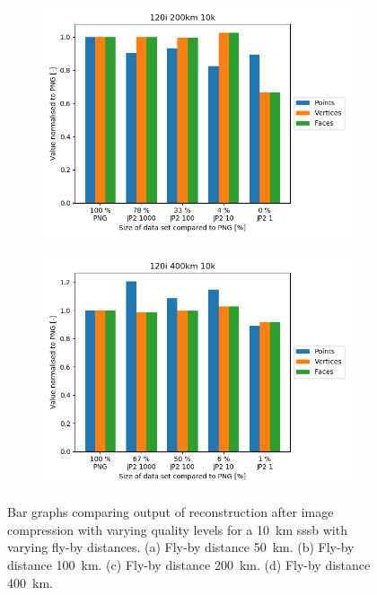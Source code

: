 \begin{figure}[htb]
        \begin{subfigure}[b]{0.49\textwidth}
            \centering
            \includegraphics[width=\textwidth]{doc/thesis/0_figures/recon/120i_200km_10k.png}
            \caption{}
            \label{fig:recon_120_200_10}
        \end{subfigure}
        \begin{subfigure}[b]{0.49\textwidth}
            \centering
            \includegraphics[width=\textwidth]{doc/thesis/0_figures/recon/120i_400km_10k.png}
            \caption{}
            \label{fig:recon_120_400_10}
        \end{subfigure}
    \caption{Bar graphs comparing output of reconstruction after image compression with varying quality levels for a \SI{10}{\kilo\meter} \gls{sssb} with varying fly-by distances. (a) Fly-by distance \SI{50}{\kilo\meter}. (b) Fly-by distance \SI{100}{\kilo\meter}. (c) Fly-by distance \SI{200}{\kilo\meter}. (d) Fly-by distance \SI{400}{\kilo\meter}.}
    \label{fig:recon_stats_10}
\end{figure}

